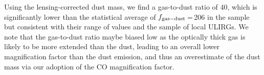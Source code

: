 \documentclass[]{emulateapj}
\begin{document}
%
Using the lensing-corrected dust mass,
we find a gas-to-dust ratio of
40, which is significantly lower than the statistical average
of $f_{\rm gas-dust}$\,=\,206
in the  sample but
consistent with their range of values and the
\citet[][]{Wilson08a}
sample of local ULIRGs. %
We note that the gas-to-dust ratio maybe biased low as
the optically thick gas is likely to be more extended than the dust, leading to
an overall lower magnification factor than the dust emission,
and thus an overestimate of the
dust mass via our adoption of the CO magnification factor.

\end{document}
